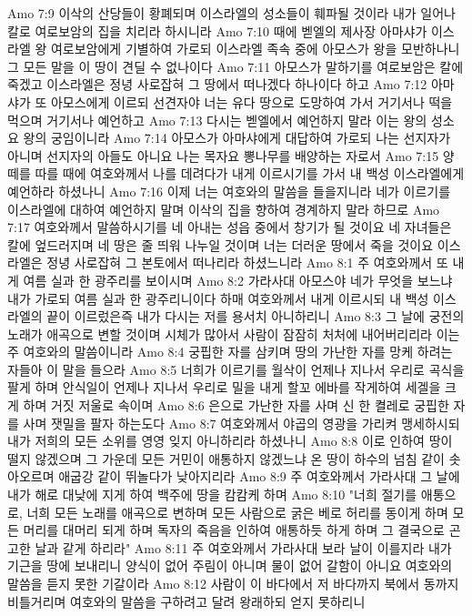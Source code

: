 Amo 7:9  이삭의 산당들이 황폐되며 이스라엘의 성소들이 훼파될 것이라 내가 일어나 칼로 여로보암의 집을 치리라 하시니라
Amo 7:10  때에 벧엘의 제사장 아마샤가 이스라엘 왕 여로보암에게 기별하여 가로되 이스라엘 족속 중에 아모스가 왕을 모반하나니 그 모든 말을 이 땅이 견딜 수 없나이다
Amo 7:11  아모스가 말하기를 여로보암은 칼에 죽겠고 이스라엘은 정녕 사로잡혀 그 땅에서 떠나겠다 하나이다 하고
Amo 7:12  아마샤가 또 아모스에게 이르되 선견자야 너는 유다 땅으로 도망하여 가서 거기서나 떡을 먹으며 거기서나 예언하고
Amo 7:13  다시는 벧엘에서 예언하지 말라 이는 왕의 성소요 왕의 궁임이니라
Amo 7:14  아모스가 아마샤에게 대답하여 가로되 나는 선지자가 아니며 선지자의 아들도 아니요 나는 목자요 뽕나무를 배양하는 자로서
Amo 7:15  양떼를 따를 때에 여호와께서 나를 데려다가 내게 이르시기를 가서 내 백성 이스라엘에게 예언하라 하셨나니
Amo 7:16  이제 너는 여호와의 말씀을 들을지니라 네가 이르기를 이스라엘에 대하여 예언하지 말며 이삭의 집을 향하여 경계하지 말라 하므로
Amo 7:17  여호와께서 말씀하시기를 네 아내는 성읍 중에서 창기가 될 것이요 네 자녀들은 칼에 엎드러지며 네 땅은 줄 띄워 나누일 것이며 너는 더러운 땅에서 죽을 것이요 이스라엘은 정녕 사로잡혀 그 본토에서 떠나리라 하셨느니라
Amo 8:1  주 여호와께서 또 내게 여름 실과 한 광주리를 보이시며
Amo 8:2  가라사대 아모스야 네가 무엇을 보느냐 내가 가로되 여름 실과 한 광주리니이다 하매 여호와께서 내게 이르시되 내 백성 이스라엘의 끝이 이르렀은즉 내가 다시는 저를 용서치 아니하리니
Amo 8:3  그 날에 궁전의 노래가 애곡으로 변할 것이며 시체가 많아서 사람이 잠잠히 처처에 내어버리리라 이는 주 여호와의 말씀이니라
Amo 8:4  궁핍한 자를 삼키며 땅의 가난한 자를 망케 하려는 자들아 이 말을 들으라
Amo 8:5  너희가 이르기를 월삭이 언제나 지나서 우리로 곡식을 팔게 하며 안식일이 언제나 지나서 우리로 밀을 내게 할꼬 에바를 작게하여 세겔을 크게 하며 거짓 저울로 속이며
Amo 8:6  은으로 가난한 자를 사며 신 한 켤레로 궁핍한 자를 사며 잿밀을 팔자 하는도다
Amo 8:7  여호와께서 야곱의 영광을 가리켜 맹세하시되 내가 저희의 모든 소위를 영영 잊지 아니하리라 하셨나니
Amo 8:8  이로 인하여 땅이 떨지 않겠으며 그 가운데 모든 거민이 애통하지 않겠느냐 온 땅이 하수의 넘침 같이 솟아오르며 애굽강 같이 뛰놀다가 낮아지리라
Amo 8:9  주 여호와께서 가라사대 그 날에 내가 해로 대낮에 지게 하여 백주에 땅을 캄캄케 하며
Amo 8:10  "너희 절기를 애통으로, 너희 모든 노래를 애곡으로 변하며 모든 사람으로 굵은 베로 허리를 동이게 하며 모든 머리를 대머리 되게 하며 독자의 죽음을 인하여 애통하듯 하게 하며 그 결국으로 곤고한 날과 같게 하리라"
Amo 8:11  주 여호와께서 가라사대 보라 날이 이를지라 내가 기근을 땅에 보내리니 양식이 없어 주림이 아니며 물이 없어 갈함이 아니요 여호와의 말씀을 듣지 못한 기갈이라
Amo 8:12  사람이 이 바다에서 저 바다까지 북에서 동까지 비틀거리며 여호와의 말씀을 구하려고 달려 왕래하되 얻지 못하리니
